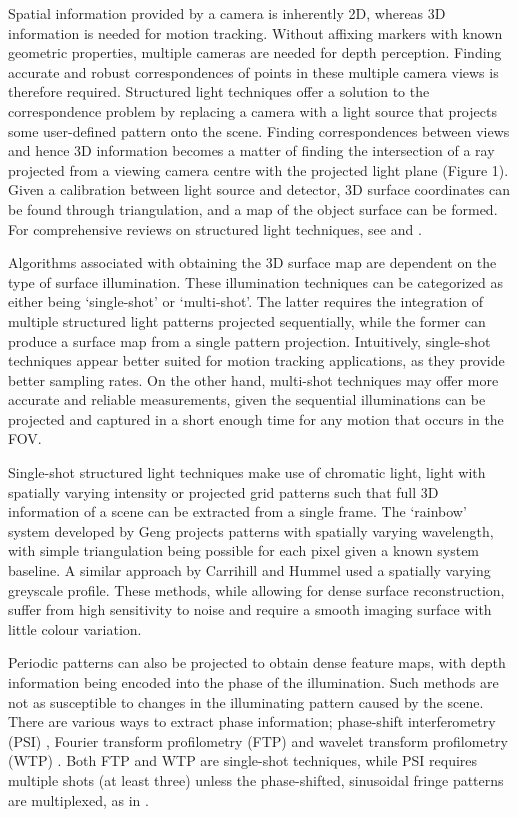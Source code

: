 \documentclass[class=article, crop=false]{standalone}
\begin{document}
Spatial information provided by a camera is inherently 2D, whereas 3D information is needed for motion tracking. Without affixing markers with known geometric properties, multiple cameras are needed for depth perception. Finding accurate and robust correspondences of points in these multiple camera views is therefore required. Structured light techniques offer a solution to the correspondence problem by replacing a camera with a light source that projects some user-defined pattern onto the scene. Finding correspondences between views and hence 3D information becomes a matter of finding the intersection of a ray projected from a viewing camera centre with the projected light plane (Figure 1). Given a calibration between light source and detector, 3D surface coordinates can be found through triangulation, and a map of the object surface can be formed. For comprehensive reviews on structured light techniques, see \cite{Geng2011} and \cite{Salvi2010}.
\par
Algorithms associated with obtaining the 3D surface map are dependent on the type of surface illumination. These illumination techniques can be categorized as either being ‘single-shot’ or ‘multi-shot’. The latter requires the integration of multiple structured light patterns projected sequentially, while the former can produce a surface map from a single pattern projection. Intuitively, single-shot techniques appear better suited for motion tracking applications, as they provide better sampling rates. On the other hand, multi-shot techniques may offer more accurate and reliable measurements, given the sequential illuminations can be projected and captured in a short enough time for any motion that occurs in the FOV. 
\par
Single-shot structured light techniques make use of chromatic light, light with spatially varying intensity or projected grid patterns such that full 3D information of a scene can be extracted from a single frame. The `rainbow' system developed by Geng \parencite*{JasonGeng1996} projects patterns with spatially varying wavelength, with simple triangulation being possible for each pixel given a known system baseline. A similar approach by Carrihill and Hummel \parencite*{Carrihill1985} used a spatially varying greyscale profile. These methods, while allowing for dense surface reconstruction, suffer from high sensitivity to noise and require a smooth imaging surface with little colour variation.
\par
Periodic patterns can also be projected to obtain dense feature maps, with depth information being encoded into the phase of the illumination. Such methods are not as susceptible to changes in the illuminating pattern caused by the scene. There are various ways to extract phase information; phase-shift interferometry (PSI) \parencite{ISI:A1974U657500060,Huang1999}, Fourier transform profilometry (FTP) \parencite{Takeda:83,Yue20071170} and wavelet transform profilometry (WTP) \parencite{Gdeisat2006482,Fernandez2010}. Both FTP and WTP are single-shot techniques, while PSI requires multiple shots (at least three) unless the phase-shifted, sinusoidal fringe patterns are multiplexed, as in \cite{Huang1999}.
\end{document}
